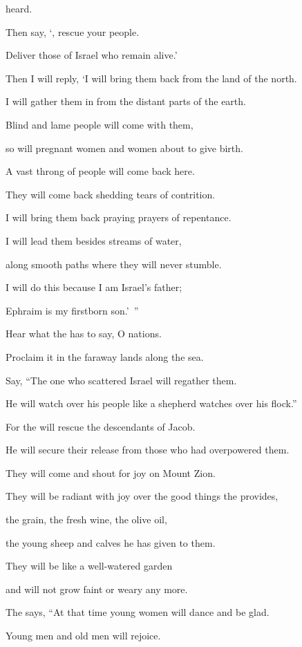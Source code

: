 {heard.
\par }{\Q Then say,
‘{}, rescue
your people.
\par }{\Q Deliver those of Israel
who remain alive.’
\par }{\Q {}Then I will reply, ‘I will bring
them back from the land
of the north.
\par }{\Q I will gather
them in from the distant parts
of the earth.
\par }{\Q Blind
and lame
people will come with them,
\par }{\Q so will pregnant women
and women about to give birth.
\par }{\Q A vast
throng of people
will come back
here.
\par }{\Q {}They will come back
shedding tears
of contrition.
\par }{\Q I will bring
them back
praying prayers
of repentance.

\par }{\Q I will lead
them besides
streams
of water,
\par }{\Q along smooth
paths
where they will never
stumble.
\par }{\Q I will do this
because
I am Israel’s
father;
\par }{\Q Ephraim
is my firstborn son.’ ”
\par }{\Q {}Hear
what
the {}
has to say, O nations.
\par }{\Q Proclaim
it in the faraway
lands along the sea.
\par }{\Q Say,
“The one who scattered
Israel
will regather
them.
\par }{\Q He will watch
over his people like a shepherd
watches over his flock.”
\par }{\Q {}For
the {}
will rescue
the descendants of Jacob.
\par }{\Q He will secure their release from
those who
had overpowered them.
\par }{\Q {}They will come
and shout
for joy on Mount
Zion.
\par }{\Q They will be radiant
with
joy over
the good things
the {}
provides,
\par }{\Q the grain,
the fresh wine,
the olive oil,
\par }{\Q the young
sheep
and calves
he has given to them.
\par }{\Q They will be
like a well-watered
garden
\par }{\Q and
will not
grow faint
or weary
any more.
\par }{\Q {}The
{} says, “At that time
young women
will dance
and be glad.
\par }{\Q Young men
and old men
will rejoice.

}
